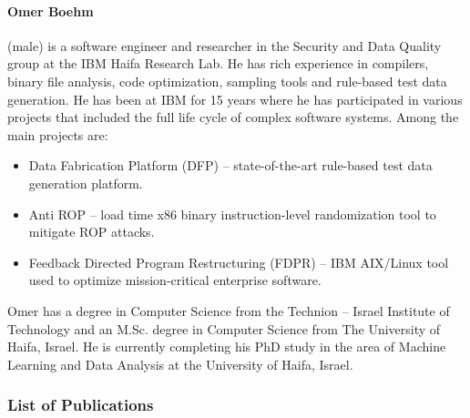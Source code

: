 \documentclass[a4paper,11pt]{article}
\begin{document}
\paragraph{Omer Boehm} (male) is a software engineer and researcher in the Security and Data Quality group at the IBM Haifa Research Lab. He has rich experience in compilers, binary file analysis, code optimization, sampling tools and rule-based test data generation. He has been at IBM for 15 years where he has participated in various projects that included the full life cycle of complex software systems. Among the main projects are:
\begin{itemize}
\item Data Fabrication Platform (DFP) – state-of-the-art rule-based test data generation platform.
\item Anti ROP – load time x86 binary instruction-level randomization tool to mitigate ROP attacks.
\item Feedback Directed Program Restructuring (FDPR) – IBM AIX/Linux tool used to optimize mission-critical enterprise software.
\end{itemize}
Omer has a degree in Computer Science from the Technion -- Israel Institute of Technology and an M.Sc. degree in Computer Science from The University of Haifa, Israel. He is currently completing his PhD study in the area of Machine Learning and Data Analysis at the University of Haifa, Israel.

\subsubsection*{List of Publications}
\end{document}
